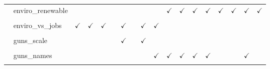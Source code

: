 \documentclass[
  12pt]{article}
\begin{document}
\begin{table}[H]
{\begin{tabular}{lcccccccccccccccc}
$\hspace{10pt}$enviro\_renewable &  &  &  &  &  &  &  &  & $\checkmark$ & $\checkmark$ & $\checkmark$ & $\checkmark$ & $\checkmark$ & $\checkmark$ & $\checkmark$ & $\checkmark$\\
\cellcolor{gray!6}{$\hspace{10pt}$enviro\_airwateracts} & \cellcolor{gray!6}{} & \cellcolor{gray!6}{} & \cellcolor{gray!6}{} & \cellcolor{gray!6}{} & \cellcolor{gray!6}{} & \cellcolor{gray!6}{} & \cellcolor{gray!6}{} & \cellcolor{gray!6}{} & \cellcolor{gray!6}{$\checkmark$} & \cellcolor{gray!6}{$\checkmark$} & \cellcolor{gray!6}{$\checkmark$} & \cellcolor{gray!6}{$\checkmark$} & \cellcolor{gray!6}{$\checkmark$} & \cellcolor{gray!6}{$\checkmark$} & \cellcolor{gray!6}{$\checkmark$} & \cellcolor{gray!6}{$\checkmark$}\\
$\hspace{10pt}$enviro\_vs\_jobs & $\checkmark$ & $\checkmark$ & $\checkmark$ &  & $\checkmark$ &  & $\checkmark$ & $\checkmark$ &  &  &  &  &  &  &  & \\
\cellcolor{gray!6}{$\textbf{Guns}$} & \cellcolor{gray!6}{} & \cellcolor{gray!6}{} & \cellcolor{gray!6}{} & \cellcolor{gray!6}{} & \cellcolor{gray!6}{} & \cellcolor{gray!6}{} & \cellcolor{gray!6}{} & \cellcolor{gray!6}{} & \cellcolor{gray!6}{} & \cellcolor{gray!6}{} & \cellcolor{gray!6}{} & \cellcolor{gray!6}{} & \cellcolor{gray!6}{} & \cellcolor{gray!6}{} & \cellcolor{gray!6}{} & \cellcolor{gray!6}{}\\
$\hspace{10pt}$guns\_scale &  &  &  &  & $\checkmark$ &  & $\checkmark$ &  &  &  &  &  &  &  &  & \\
\cellcolor{gray!6}{$\hspace{10pt}$guns\_bgchecks} & \cellcolor{gray!6}{} & \cellcolor{gray!6}{} & \cellcolor{gray!6}{} & \cellcolor{gray!6}{} & \cellcolor{gray!6}{} & \cellcolor{gray!6}{} & \cellcolor{gray!6}{} & \cellcolor{gray!6}{$\checkmark$} & \cellcolor{gray!6}{$\checkmark$} & \cellcolor{gray!6}{$\checkmark$} & \cellcolor{gray!6}{$\checkmark$} & \cellcolor{gray!6}{$\checkmark$} & \cellcolor{gray!6}{$\checkmark$} & \cellcolor{gray!6}{$\checkmark$} & \cellcolor{gray!6}{} & \cellcolor{gray!6}{$\checkmark$}\\
$\hspace{10pt}$guns\_names &  &  &  &  &  &  &  & $\checkmark$ & $\checkmark$ & $\checkmark$ & $\checkmark$ & $\checkmark$ &  &  & $\checkmark$ & \\
\cellcolor{gray!6}{$\hspace{10pt}$guns\_assaultban} & \cellcolor{gray!6}{} & \cellcolor{gray!6}{} & \cellcolor{gray!6}{} & \cellcolor{gray!6}{} & \cellcolor{gray!6}{} & \cellcolor{gray!6}{} & \cellcolor{gray!6}{} & \cellcolor{gray!6}{$\checkmark$} & \cellcolor{gray!6}{$\checkmark$} & \cellcolor{gray!6}{$\checkmark$} & \cellcolor{gray!6}{$\checkmark$} & \cellcolor{gray!6}{$\checkmark$} & \cellcolor{gray!6}{$\checkmark$} & \cellcolor{gray!6}{$\checkmark$} & \cellcolor{gray!6}{$\checkmark$} & \cellcolor{gray!6}{$\checkmark$}\\

\end{tabular}}
\end{table}
\end{document}
